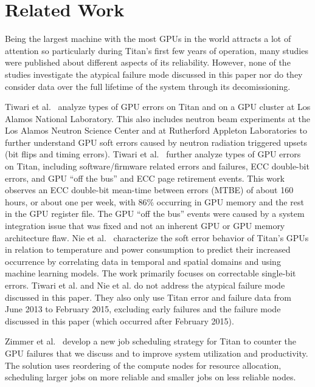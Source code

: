 \section{Related Work}
\label{section:related}

Being the largest machine with the most GPUs in the world attracts a lot of attention so particularly during Titan's first few years of operation, many studies were published about different aspects of its reliability. However, none of the studies investigate the atypical failure mode discussed in this paper nor do they consider data over the full lifetime of the system through its decomissioning.

Tiwari et al.~\cite{Tiwari15Experience,tiwari15Understand} analyze types of GPU errors on Titan and on a GPU cluster at Los Alamos National Laboratory. This also includes neutron beam experiments at the Los Alamos Neutron Science Center and at Rutherford Appleton Laboratories to further understand GPU soft errors caused by neutron radiation triggered upsets (bit flips and timing errors).
%
Tiwari et al.~\cite{10.1145/2807591.2807666} further analyze types of GPU errors on Titan, including software/firmware related errors and failures, ECC double-bit errors, and GPU ``off the bus'' and ECC page retirement events. This work observes an ECC double-bit mean-time between errors (MTBE) of about 160 hours, or about one per week, with 86\% occurring in GPU memory and the rest in the GPU register file. The GPU ``off the bus'' events were caused by a system integration issue that was fixed and not an inherent GPU or GPU memory architecture flaw.
%
Nie et al.~\cite{7446091,nie17characterizing,nie18machine} characterize the soft error behavior of Titan's GPUs in relation to temperature and power consumption to predict their increased occurrence by correlating data in temporal and spatial domains and using machine learning models. The work primarily focuses on correctable single-bit errors.
%
Tiwari et al. and Nie et al. do not address the atypical failure mode discussed in this paper. They also only use Titan error and failure data from June 2013 to February 2015, excluding early failures and the failure mode discussed in this paper (which occurred after February 2015).

Zimmer et al.~\cite{8665764} develop a new job scheduling strategy for Titan to counter the GPU failures that we discuss and to improve system utilization and productivity. The solution uses reordering of the compute nodes for resource allocation, scheduling larger jobs on more reliable and smaller jobs on less reliable nodes.

